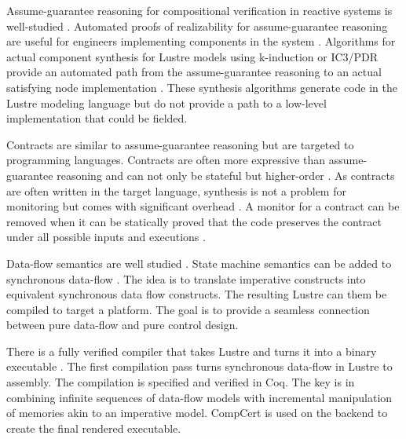 Assume-guarantee reasoning for compositional verification in reactive systems is well-studied \cite{10.1007/978-3-642-28891-3_13, agree2013, 10.1145/2658982.2527272, 10.1007/978-3-319-17524-9_7}. Automated proofs of realizability for assume-guarantee reasoning are useful for engineers implementing components in the system \cite{10.1007/978-3-319-17524-9_13, 10.1007/978-3-319-29613-5_7}. Algorithms for actual component synthesis for Lustre models using k-induction or IC3/PDR provide an automated path from the assume-guarantee reasoning to an actual satisfying node implementation \cite{katis2017synthesis, 10.1007/978-3-319-89963-3_10}. These synthesis algorithms generate code in the Lustre modeling language but do not provide a path to a low-level implementation that could be fielded.

Contracts are similar to assume-guarantee reasoning but are targeted to programming languages. Contracts are often more expressive than assume-guarantee reasoning and can not only be stateful but higher-order \cite{10.1145/583852.581484}. As contracts are often written in the target language, synthesis is not a problem for monitoring but comes with significant overhead \cite{10.1007/978-3-642-28869-2_11}. A monitor for a contract can be removed when it can be statically proved that the code preserves the contract under all possible inputs and executions \cite{10.1145/3158139}.

Data-flow semantics are well studied \cite{10.1145/41625.41641,97300, 10.1145/1379023.1375674,10.1145/2345141.2248426,10.1007/978-3-540-45212-6_10}. State machine semantics can be added to synchronous data-flow \cite{10.1145/1086228.1086261}. The idea is to translate imperative constructs into equivalent synchronous data flow constructs. The resulting Lustre can them be compiled to target a platform. The goal is to provide a seamless connection between pure data-flow and pure control design.

There is a fully verified compiler that takes Lustre and turns it into a binary executable \cite{10.1145/3140587.3062358}. The first compilation pass turns synchronous data-flow in Lustre to assembly. The compilation is specified and verified in Coq. The key is in combining infinite sequences of data-flow models with incremental manipulation of memories akin to an imperative model. CompCert is used on the backend to create the final rendered executable.